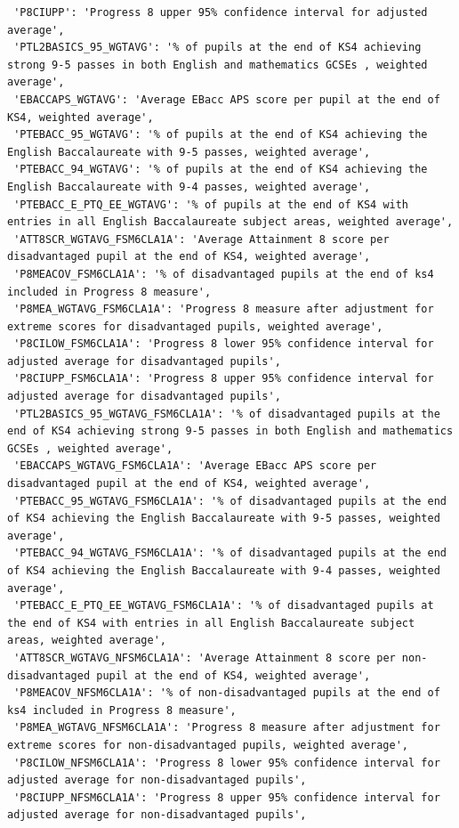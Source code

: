 \documentclass[
  letterpaper,
  DIV=11,
  numbers=noendperiod]{scrartcl}
\begin{document}
\begin{verbatim}
 'P8CIUPP': 'Progress 8 upper 95% confidence interval for adjusted average',
 'PTL2BASICS_95_WGTAVG': '% of pupils at the end of KS4 achieving strong 9-5 passes in both English and mathematics GCSEs , weighted average',
 'EBACCAPS_WGTAVG': 'Average EBacc APS score per pupil at the end of KS4, weighted average',
 'PTEBACC_95_WGTAVG': '% of pupils at the end of KS4 achieving the English Baccalaureate with 9-5 passes, weighted average',
 'PTEBACC_94_WGTAVG': '% of pupils at the end of KS4 achieving the English Baccalaureate with 9-4 passes, weighted average',
 'PTEBACC_E_PTQ_EE_WGTAVG': '% of pupils at the end of KS4 with entries in all English Baccalaureate subject areas, weighted average',
 'ATT8SCR_WGTAVG_FSM6CLA1A': 'Average Attainment 8 score per disadvantaged pupil at the end of KS4, weighted average',
 'P8MEACOV_FSM6CLA1A': '% of disadvantaged pupils at the end of ks4 included in Progress 8 measure',
 'P8MEA_WGTAVG_FSM6CLA1A': 'Progress 8 measure after adjustment for extreme scores for disadvantaged pupils, weighted average',
 'P8CILOW_FSM6CLA1A': 'Progress 8 lower 95% confidence interval for adjusted average for disadvantaged pupils',
 'P8CIUPP_FSM6CLA1A': 'Progress 8 upper 95% confidence interval for adjusted average for disadvantaged pupils',
 'PTL2BASICS_95_WGTAVG_FSM6CLA1A': '% of disadvantaged pupils at the end of KS4 achieving strong 9-5 passes in both English and mathematics GCSEs , weighted average',
 'EBACCAPS_WGTAVG_FSM6CLA1A': 'Average EBacc APS score per disadvantaged pupil at the end of KS4, weighted average',
 'PTEBACC_95_WGTAVG_FSM6CLA1A': '% of disadvantaged pupils at the end of KS4 achieving the English Baccalaureate with 9-5 passes, weighted average',
 'PTEBACC_94_WGTAVG_FSM6CLA1A': '% of disadvantaged pupils at the end of KS4 achieving the English Baccalaureate with 9-4 passes, weighted average',
 'PTEBACC_E_PTQ_EE_WGTAVG_FSM6CLA1A': '% of disadvantaged pupils at the end of KS4 with entries in all English Baccalaureate subject areas, weighted average',
 'ATT8SCR_WGTAVG_NFSM6CLA1A': 'Average Attainment 8 score per non-disadvantaged pupil at the end of KS4, weighted average',
 'P8MEACOV_NFSM6CLA1A': '% of non-disadvantaged pupils at the end of ks4 included in Progress 8 measure',
 'P8MEA_WGTAVG_NFSM6CLA1A': 'Progress 8 measure after adjustment for extreme scores for non-disadvantaged pupils, weighted average',
 'P8CILOW_NFSM6CLA1A': 'Progress 8 lower 95% confidence interval for adjusted average for non-disadvantaged pupils',
 'P8CIUPP_NFSM6CLA1A': 'Progress 8 upper 95% confidence interval for adjusted average for non-disadvantaged pupils',

\end{verbatim}
\end{document}
